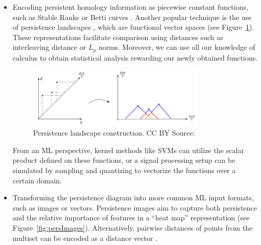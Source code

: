 \documentclass[../main.tex]{subfiles}
\begin{document}
\begin{itemize}
    \item Encoding persistent homology information as piecewise constant functions, such as Stable Ranks \cite{agerberg_supervised_2021} or Betti curves \cite{hensel_survey_2021}. Another popular technique is the use of persistence landscapes \cite{bubenik_statistical_2015}, which are functional vector spaces (see Figure~\ref{fig:landscapes}). These representations facilitate comparison using distances such as interleaving distance or $L_p$ norms. Moreover, we can use all our knowledge of calculus to obtain statistical analysis rewarding our newly obtained functions. 

    \begin{figure}[!ht]
        \centering
        \includegraphics[width=0.8\textwidth]{figures/bg/landscapes.png} 
        \caption{Persistence landscape construction. CC BY Source: \cite{ma_using_2020}}
        \label{fig:landscapes}
    \end{figure}

    From an ML perspective, kernel methods like SVMs can utilize the scalar product defined on these functions, or a signal processing setup can be simulated by sampling and quantizing to vectorize the functions over a certain domain.
    
    \item Transforming the persistence diagram into more common ML input formats, such as images or vectors. Persistence images \cite{adams_persistence_2016} aim to capture both persistence and the relative importance of features in a ``heat map'' representation (see Figure~\ref{fig:persImages}). Alternatively, pairwise distances of points from the multiset can be encoded as a distance vector \cite{carriere_stable_2015}.


\end{itemize}
\end{document}
